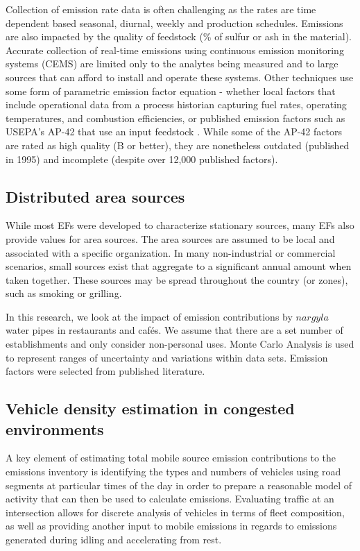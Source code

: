 Collection of emission rate data is often challenging as the rates are time dependent based seasonal, diurnal, weekly and production schedules. Emissions are also impacted by the quality of feedstock (\% of sulfur or ash in the material). Accurate collection of real-time emissions using continuous emission monitoring systems (CEMS) are limited only to the analytes being measured and to large sources that can afford to install and operate these systems. Other techniques use some form of parametric emission factor equation - whether local factors that include operational data from a process historian capturing fuel rates, operating temperatures, and combustion efficiencies, or published emission factors such as USEPA's AP-42 that use an input feedstock \citep{USEPA1995}. While some of the AP-42 factors are rated as high quality (B or better), they are nonetheless outdated (published in 1995) and incomplete (despite over 12,000 published factors).

\subsection{Distributed area sources}
While most EFs were developed to characterize stationary sources, many EFs also provide values for area sources. The area sources are assumed to be local and associated with a specific organization. In many non-industrial or commercial scenarios, small sources exist that aggregate to a significant annual amount when taken together.  These sources may be spread throughout the country (or zones), such as smoking or grilling.

In this research, we look at the impact of emission contributions by $nargyla$ water pipes in restaurants and caf\'es. We assume that there are a set number of establishments and only consider non-personal uses.  Monte Carlo Analysis is used to represent ranges of uncertainty and variations within data sets. Emission factors were selected from published literature.

\subsection{Vehicle density estimation in congested environments}

A key element of estimating total mobile source emission contributions to the emissions inventory is identifying the types and numbers of vehicles using road segments at particular times of the day in order to prepare a reasonable model of activity that can then be used to calculate emissions. Evaluating traffic at an intersection allows for discrete analysis of vehicles in terms of fleet composition, as well as providing another input to mobile emissions in regards to emissions generated during idling and accelerating from rest.

